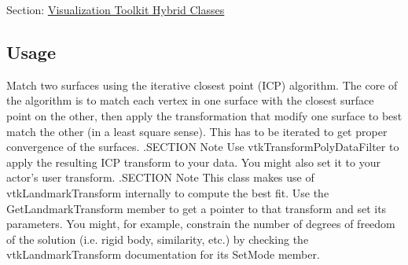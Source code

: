Section\-: \hyperlink{sec_vtkhybrid}{Visualization Toolkit Hybrid Classes} \hypertarget{vtkwidgets_vtkxyplotwidget_Usage}{}\subsection{Usage}\label{vtkwidgets_vtkxyplotwidget_Usage}
Match two surfaces using the iterative closest point (I\-C\-P) algorithm. The core of the algorithm is to match each vertex in one surface with the closest surface point on the other, then apply the transformation that modify one surface to best match the other (in a least square sense). This has to be iterated to get proper convergence of the surfaces. .S\-E\-C\-T\-I\-O\-N Note Use vtk\-Transform\-Poly\-Data\-Filter to apply the resulting I\-C\-P transform to your data. You might also set it to your actor's user transform. .S\-E\-C\-T\-I\-O\-N Note This class makes use of vtk\-Landmark\-Transform internally to compute the best fit. Use the Get\-Landmark\-Transform member to get a pointer to that transform and set its parameters. You might, for example, constrain the number of degrees of freedom of the solution (i.\-e. rigid body, similarity, etc.) by checking the vtk\-Landmark\-Transform documentation for its Set\-Mode member.

